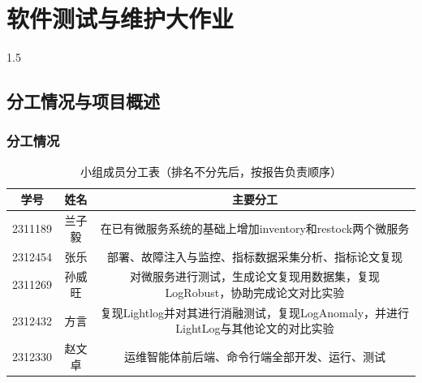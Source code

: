 \documentclass[a4paper,12pt]{report}
\begin{document}
\chapter*{软件测试与维护大作业}
\setcounter{page}{1}
\begin{spacing}{1.5}
\songti{}

\section{分工情况与项目概述}
\subsection{分工情况}
    \begin{center}
    \begin{table}[h]
        \centering
        \renewcommand{\arraystretch}{1.5}  %
        \begin{tabular}{|c|c|c|}  %
            \hline
            \textbf{学号} & \textbf{姓名} & \textbf{    主要分工    } \\
            \hline
            2311189 & 兰子毅 & 
            \begin{minipage}[t]{12cm}
               在已有微服务系统的基础上增加inventory和restock两个微服务
            \end{minipage} \\
            \hline
            2312454 & 张乐 & 
            \begin{minipage}[t]{12cm}
                部署、故障注入与监控、指标数据采集分析、指标论文复现
            \end{minipage} \\
            \hline
            2311269 & 孙威旺 & 
            \begin{minipage}[t]{12cm}
                对微服务进行测试，生成论文复现用数据集，复现LogRobust，协助完成论文对比实验
            \end{minipage} \\
            \hline
            2312432 & 方言 & 
            \begin{minipage}[t]{12cm}
                复现Lightlog并对其进行消融测试，复现LogAnomaly，并进行LightLog与其他论文的对比实验
            \end{minipage} \\
            \hline
            2312330 & 赵文卓 & 
            \begin{minipage}[t]{12cm}
                运维智能体前后端、命令行端全部开发、运行、测试
            \end{minipage} \\
            \hline
        \end{tabular}
        \caption{小组成员分工表（排名不分先后，按报告负责顺序）}
        \label{tab:team_division}
    \end{table}
\end{center}


\end{spacing}
\end{document}
